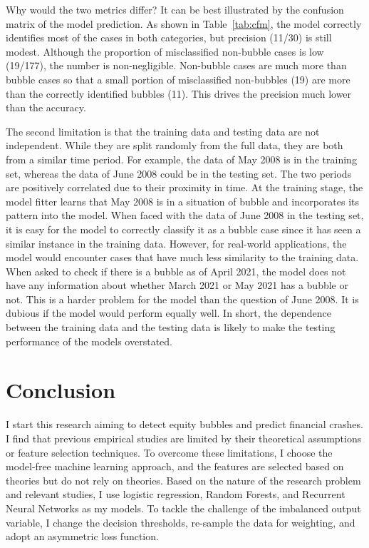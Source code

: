 \documentclass[12pt, man, a4paper, floatsintext]{apa7}
\begin{document}
Why would the two metrics differ? It can be best illustrated by the confusion matrix of the model prediction. As shown in Table~\ref{tab:cfm}, the model correctly identifies most of the cases in both categories, but precision (11/30) is still modest. Although the proportion of misclassified non-bubble cases is low (19/177), the number is non-negligible. Non-bubble cases are much more than bubble cases so that a small portion of misclassified non-bubbles (19) are more than the correctly identified bubbles (11). This drives the precision much lower than the accuracy. 



The second limitation is that the training data and testing data are not independent. While they are split randomly from the full data, they are both from a similar time period. For example, the data of May 2008 is in the training set, whereas the data of June 2008 could be in the testing set. The two periods are positively correlated due to their proximity in time. At the training stage, the model fitter learns that May 2008 is in a situation of bubble and incorporates its pattern into the model. When faced with the data of June 2008 in the testing set, it is easy for the model to correctly classify it as a bubble case since it has seen a similar instance in the training data. However, for real-world applications, the model would encounter cases that have much less similarity to the training data. When asked to check if there is a bubble as of April 2021, the model does not have any information about whether March 2021 or May 2021 has a bubble or not. This is a harder problem for the model than the question of June 2008. It is dubious if the model would perform equally well. In short, the dependence between the training data and the testing data is likely to make the testing performance of the models overstated.


    \section{Conclusion}

I start this research aiming to detect equity bubbles and predict financial crashes. I find that previous empirical studies are limited by their theoretical assumptions or feature selection techniques. To overcome these limitations, I choose the model-free machine learning approach, and the features are selected based on theories but do not rely on theories. Based on the nature of the research problem and relevant studies, I use logistic regression, Random Forests, and Recurrent Neural Networks as my models. To tackle the challenge of the imbalanced output variable, I change the decision thresholds, re-sample the data for weighting, and adopt an asymmetric loss function.
\end{document}
